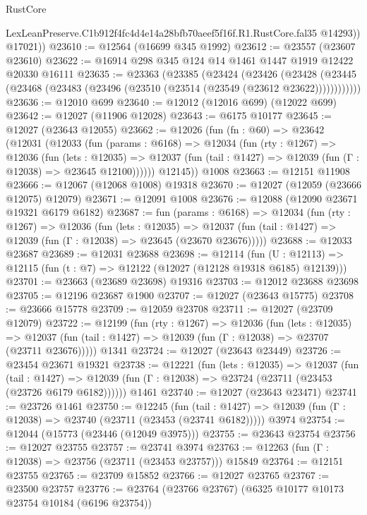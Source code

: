 \begin{lexlean}{RustCore}
\begin{coremodule}
            LexLeanPreserve.C1b912f4fc4d4e14a28bfb70aeef5f16f.R1.RustCore.fal35
            @14293))
        @17021))
@23610 := @12564 (@16699 @345 @1992)
@23612 := @23557 (@23607 @23610)
@23622 := @16914 @298 @345 @124 @14 @1461 @1447 @1919 @12422 @20330 @16111
@23635 := @23363
    (@23385
      (@23424
        (@23426
          (@23428 (@23445 (@23468 (@23483 (@23496 (@23510 (@23514 (@23549 (@23612 @23622))))))))))))
@23636 := @12010 @699
@23640 := @12012 (@12016 @699) (@12022 @699)
@23642 := @12027 (@11906 @12028)
@23643 := @6175 @10177
@23645 := @12027 (@23643 @12055)
@23662 := @12026
    (fun (fn : @60) =>
    @23642
      (@12031
        (@12033
          (fun (params : @6168) =>
          @12034
            (fun (rty : @1267) =>
            @12036
              (fun (lets : @12035) =>
              @12037 (fun (tail : @1427) => @12039 (fun (Γ : @12038) => @23645 @12100))))))
        @12145))
    @1008
@23663 := @12151 @11908
@23666 := @12067 (@12068 @1008) @19318
@23670 := @12027 (@12059 (@23666 @12075) @12079)
@23671 := @12091 @1008
@23676 := @12088 (@12090 @23671 @19321 @6179 @6182)
@23687 := fun (params : @6168) =>
  @12034
    (fun (rty : @1267) =>
    @12036
      (fun (lets : @12035) =>
      @12037 (fun (tail : @1427) => @12039 (fun (Γ : @12038) => @23645 (@23670 @23676)))))
@23688 := @12033 @23687
@23689 := @12031 @23688
@23698 := @12114
    (fun (U : @12113) => @12115 (fun (t : @7) => @12122 (@12027 (@12128 @19318 @6185) @12139)))
@23701 := @23663 (@23689 @23698) @19316
@23703 := @12012 @23688 @23698
@23705 := @12196 @23687 @1900
@23707 := @12027 (@23643 @15775)
@23708 := @23666 @15778
@23709 := @12059 @23708
@23711 := @12027 (@23709 @12079)
@23722 := @12199
    (fun (rty : @1267) =>
    @12036
      (fun (lets : @12035) =>
      @12037 (fun (tail : @1427) => @12039 (fun (Γ : @12038) => @23707 (@23711 @23676)))))
    @1341
@23724 := @12027 (@23643 @23449)
@23726 := @23454 @23671 @19321
@23738 := @12221
    (fun (lets : @12035) =>
    @12037
      (fun (tail : @1427) =>
      @12039 (fun (Γ : @12038) => @23724 (@23711 (@23453 (@23726 @6179 @6182))))))
    @1461
@23740 := @12027 (@23643 @23471)
@23741 := @23726 @1461
@23750 := @12245
    (fun (tail : @1427) => @12039 (fun (Γ : @12038) => @23740 (@23711 (@23453 (@23741 @6182)))))
    @3974
@23754 := @12044 (@15773 (@23446 (@12049 @3975)))
@23755 := @23643 @23754
@23756 := @12027 @23755
@23757 := @23741 @3974
@23763 := @12263 (fun (Γ : @12038) => @23756 (@23711 (@23453 @23757))) @15849
@23764 := @12151 @23755
@23765 := @23709 @15852
@23766 := @12027 @23765
@23767 := @23500 @23757
@23776 := @23764 (@23766 @23767) (@6325 @10177 @10173 @23754 @10184 (@6196 @23754))

\end{coremodule}
\end{lexlean}
